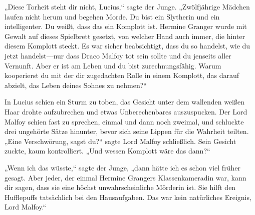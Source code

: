 „Diese Torheit steht dir nicht, Lucius,“ sagte der Junge. „Zwölfjährige Mädchen laufen nicht herum und begehen Morde. Du bist ein Slytherin und ein intelligenter. Du weißt, dass das ein Komplott ist. Hermine Granger wurde mit Gewalt auf dieses Spielbrett gesetzt, von welcher Hand auch immer, die hinter diesem Komplott steckt. Es war sicher beabsichtigt, dass du so handelst, wie du jetzt handelst—nur dass Draco Malfoy tot sein sollte und du jenseits aller Vernunft. Aber er ist am Leben und du bist zurechnungsfähig. Warum kooperierst du mit der dir zugedachten Rolle in einem Komplott, das darauf abzielt, das Leben deines Sohnes zu nehmen?“

In Lucius schien ein Sturm zu toben, das Gesicht unter dem wallenden weißen Haar drohte aufzubrechen und etwas Unberechenbares auszuspucken. Der Lord Malfoy schien fast zu sprechen, einmal und dann noch zweimal, und schluckte drei ungehörte Sätze hinunter, bevor sich seine Lippen für die Wahrheit teilten.
„Eine Verschwörung, sagst du?“ sagte Lord Malfoy schließlich. Sein Gesicht zuckte, kaum kontrolliert. „Und wessen Komplott wäre das dann?“

„Wenn ich das wüsste,“ sagte der Junge, „dann hätte ich es schon viel früher gesagt. Aber jeder, der einmal Hermine Grangers Klassenkameradin war, kann dir sagen, dass sie eine höchst unwahrscheinliche Mörderin ist. Sie hilft den Hufflepuffs tatsächlich bei den Hausaufgaben. Das war kein natürliches Ereignis, Lord Malfoy.“

